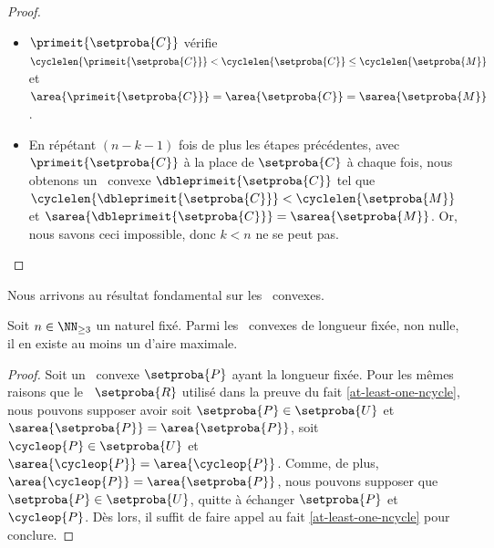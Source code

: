 \begin{proof}
\begin{itemize}
        \item $\primeit{\setproba{C}}$ vérifie
        $\cyclelen{\primeit{\setproba{C}}} < \cyclelen{\setproba{C}} \leq \cyclelen{\setproba{M}}$
        et
        $\area{\primeit{\setproba{C}}} = \area{\setproba{C}} = \sarea{\setproba{M}}$.


        \item En répétant $(n - k - 1)$ fois de plus les étapes précédentes, avec $\primeit{\setproba{C}}$ à la place de $\setproba{C}$ à chaque fois,
        nous obtenons un \ngone\ convexe $\dbleprimeit{\setproba{C}}$
        tel que
        $\cyclelen{\dbleprimeit{\setproba{C}}} < \cyclelen{\setproba{M}}$
        et
        $\sarea{\dbleprimeit{\setproba{C}}} = \sarea{\setproba{M}}$.
        Or, nous savons ceci impossible, donc $k < n$ ne se peut pas.
    \end{itemize}

    \null\vspace{-6ex}
\end{proof}




Nous arrivons au résultat fondamental sur les \ngones\ convexes.


\begin{fact} \label{at-least-one-ngone-convex}
    Soit $n \in \NN_{\geq3}$ un naturel fixé.
    Parmi les \ngones\ convexes de longueur fixée, non nulle, il en existe au moins un d'aire maximale.
\end{fact}


\begin{proof}
    Soit un \ngone\ convexe $\setproba{P}$ ayant la longueur fixée.
    Pour les mêmes raisons que le \nreg\ $\setproba{R}$ utilisé dans la preuve du fait \ref{at-least-one-ncycle},
    nous pouvons supposer avoir
    soit $\setproba{P} \in \setproba{U}$ et $\sarea{\setproba{P}} = \area{\setproba{P}}$,
    soit $\cycleop{P} \in \setproba{U}$ et $\sarea{\cycleop{P}} = \area{\cycleop{P}}$.
    Comme, de plus, $\area{\cycleop{P}} = \area{\setproba{P}}$,
    nous pouvons supposer que $\setproba{P} \in \setproba{U}$,
    quitte à échanger $\setproba{P}$ et $\cycleop{P}$.
    Dès lors, il suffit de faire appel au fait \ref{at-least-one-ncycle} pour conclure.
\end{proof}
